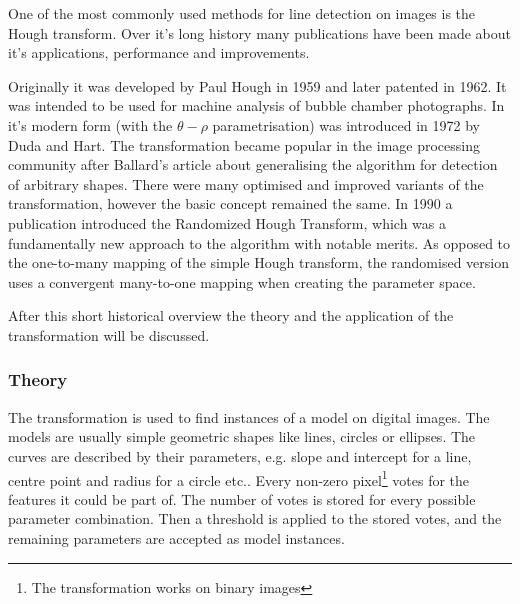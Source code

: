One of the most commonly used methods for line detection on images is the Hough transform.
Over it's long history many publications have been made about it's applications, performance and improvements.

Originally it was developed by Paul Hough in 1959 and later patented in 1962\cite{houghPatent}.
It was intended to be used for machine analysis of bubble chamber photographs.
In it's modern form (with the $\theta-\rho$ parametrisation) was introduced in 1972 by Duda and Hart\cite{houghThetaRho}.
The transformation became popular in the image processing community after Ballard's article\cite{BALLARD1981111} about generalising the algorithm for detection of arbitrary shapes.
There were many optimised and improved variants of the transformation, however the basic concept remained the same.
In 1990 a publication\cite{XU1990331} introduced the Randomized Hough Transform, which was a fundamentally new approach to the algorithm with notable merits.
As opposed to the one-to-many mapping of the simple Hough transform, the randomised version uses a convergent many-to-one mapping when creating the parameter space.

After this short historical overview the theory and the application of the transformation will be discussed.

\subsubsection{Theory}

The transformation is used to find instances of a model on digital images.
The models are usually simple geometric shapes like lines, circles or ellipses.
The curves are described by their parameters, e.g. slope and intercept for a line, centre point and radius for a circle etc..
Every non-zero pixel\footnote{The transformation works on binary images} votes for the features it could be part of.
The number of votes is stored for every possible parameter combination.
Then a threshold is applied to the stored votes, and the remaining parameters are accepted as model instances.
	
